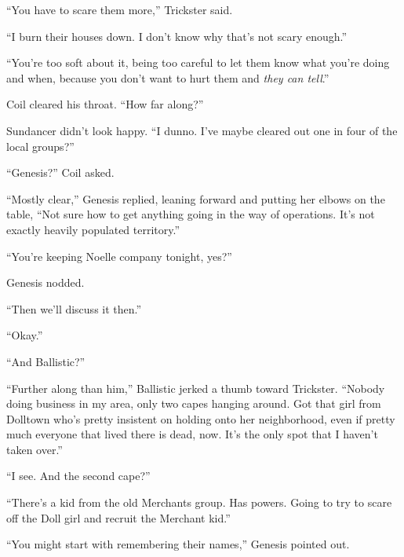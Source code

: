 ``You have to scare them more,'' Trickster said.



``I burn their houses down.  I don't know why that's not scary enough.''



``You're too soft about it, being too careful to let them know what you're doing and when, because you don't want to hurt them and \emph{they can tell}.''



Coil cleared his throat.  ``How far along?''



Sundancer didn't look happy.  ``I dunno.  I've maybe cleared out one in four of the local groups?''



``Genesis?'' Coil asked.



``Mostly clear,'' Genesis replied, leaning forward and putting her elbows on the table, ``Not sure how to get anything going in the way of operations.  It's not exactly heavily populated territory.''



``You're keeping Noelle company tonight, yes?''



Genesis nodded.



``Then we'll discuss it then.''



``Okay.''



``And Ballistic?''



``Further along than him,'' Ballistic jerked a thumb toward Trickster.  ``Nobody doing business in my area, only two capes hanging around.  Got that girl from Dolltown who's pretty insistent on holding onto her neighborhood, even if pretty much everyone that lived there is dead, now.  It's the only spot that I haven't taken over.''



``I see.  And the second cape?''



``There's a kid from the old Merchants group.  Has powers.  Going to try to scare off the Doll girl and recruit the Merchant kid.''



``You might start with remembering their names,'' Genesis pointed out.



